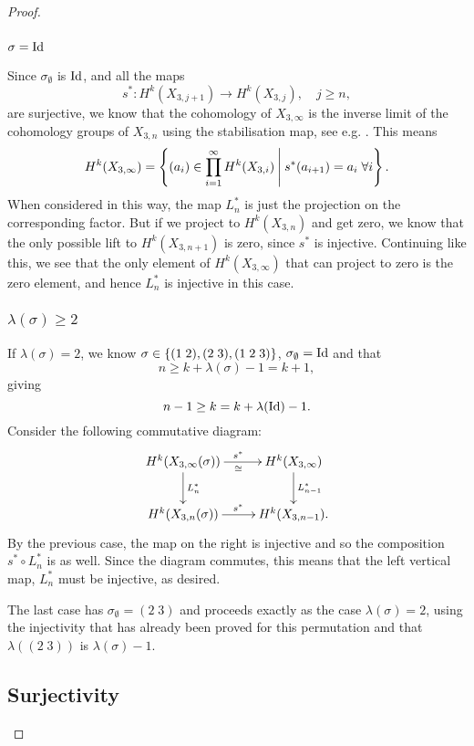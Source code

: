\begin{proof}
  \subsubsection{$\sigma = \operatorname{Id}$}
  
  Since $\sigma_{\emptyset}$ is $\operatorname{Id}$, and all the maps
  \[ s^* : H^k(X_{3,j+1}) \to H^k(X_{3,j}), \quad j \geq n, \]
  are surjective, we know that the cohomology
  of $X_{3,\infty}$ is the inverse
  limit of the cohomology groups of $X_{3,n}$ using the stabilisation
  map, see e.g. \cite[Chapter 19.4]{may}.
  This means
  \[ H^k(X_{3,\infty}) = \left\{  (a_i)\in \prod_{i=1}^\infty
    H^k(X_{3,i}) \:\Bigg\vert\: s^*(a_{i+1}) = a_i \;\forall i \right\}. \]
  When considered in this way, the map $L_n^*$ is just the projection on
  the corresponding factor. But if we project to $H^k(X_{3,n})$ and
  get zero, we know that
  the only possible lift to $H^k(X_{3,n+1})$ is zero, since $s^*$ is
  injective. Continuing like this, we see that the only element of
  $H^k(X_{3,\infty})$ that can project to zero is the zero element, and
  hence $L_{n}^*$ is injective in this case.
  
  \subsubsection{$\lambda(\sigma) \geq 2$}
  
  If $\lambda(\sigma)=2$, we know $\sigma \in
  \left\{ (1\;2),(2\;3),(1\;2\;3) \right\}$,
  $\sigma_{\emptyset} = \operatorname{Id}$ and that 
  \[ n \geq k + \lambda(\sigma) - 1 = k+1, \]
  giving 
  \[ n-1\geq k = k +\lambda(\operatorname{Id})-1. \]
  Consider the following commutative diagram:
  \[ \xymatrix{ H^k(X_{3,\infty}(\sigma)) \ar[r]^{s^*}_{\cong}
    \ar[d]^{L_n^*} & 
    H^k(X_{3,\infty}) \ar[d]^{L_{n-1}^*} \\
    H^k(X_{3,n}(\sigma)) \ar[r]^{s^*} & H^k(X_{3,n-1}).
  } \]
  By the previous case, the map on the right is injective and so the
  composition $s^* \circ L_{n}^*$ is as well. Since the diagram
  commutes, this means that the left vertical map, $L_n^*$ must be
  injective, as desired.
  
  The last case has $\sigma_{\emptyset} = (2\;3)$ and proceeds exactly
  as the case $\lambda(\sigma) = 2$, using the injectivity that has
  already been proved for this permutation and that $\lambda((2\;3))$ is
  $\lambda(\sigma)-1$.
  
  \subsection{Surjectivity}
  

\end{proof}
